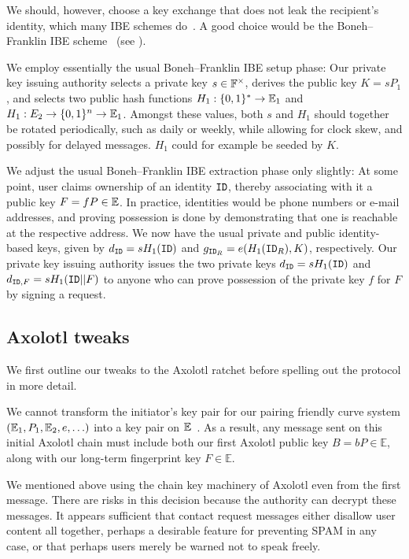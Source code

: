 \documentclass[twoside,letterpaper]{sig-alternate}
\begin{document}
We should, however, choose a key exchange that does not leak the recipient's
identity, which many IBE schemes do~\cite{AnonIBE}.
A good choice would be the Boneh–Franklin IBE scheme~\cite{BF-IBE}
(see \cite[??]{BoyenMIBS}).

We employ essentially the usual Boneh–Franklin IBE setup phase:
Our private key issuing authority
 selects a private key $s \in \mathbb{F}^\times$,
 derives the public key $K = s P_1$, and
 selects two public hash functions
  $H_1 : \{0,1\}^* \to \mathbb{E}_1$ and $H_1 : E_2 \to \{0,1\}^n \to \mathbb{E}_1$.
Amongst these values, both $s$ and $H_1$ should together be rotated
 periodically, such as daily or weekly,
while allowing for clock skew, and possibly for delayed messages.
$H_1$ could for example be seeded by $K$.

We adjust the usual Boneh–Franklin IBE extraction phase only slightly:
At some point, user claims ownership of an identity $\mathtt{ID}$, thereby
 associating with it a public key $F = f P \in \mathbb{E}$.
In practice, identities would be phone numbers or e-mail addresses,
and proving possession is done by demonstrating that
one is reachable at the respective address.
We now have the usual private and public identity-based keys, given by
 $d_{\mathtt{ID}} = s H_1(\mathtt{ID})$ and $g_{\mathtt{ID}_R} = e(H_1(\mathtt{ID}_R),K)$, respectively.
Our private key issuing authority issues the two private keys
 $d_{\mathtt{ID}} = s H_1(\mathtt{ID})$ and $d_{\mathtt{ID},F} = s H_1(\mathtt{ID} || F)$
to anyone who can prove possession of the private key $f$ for $F$
 by signing a request. 

\subsection{Axolotl tweaks} %

We first outline our tweaks to the Axolotl ratchet before
 spelling out the protocol in more detail.

We cannot transform the initiator's key pair for
 our pairing friendly curve system $(\mathbb{E}_1,P_1,\mathbb{E}_2,e,\ldots)$
into a key pair on $\mathbb{E}$~\cite{??no_homomorphism??}.
As a result, any message sent on this initial Axolotl chain must include
both our first Axolotl public key $B = b P \in \mathbb{E}$,
 along with our long-term fingerprint key $F \in \mathbb{E}$.

We mentioned above using the chain key machinery of Axolotl even from
the first message.  There are risks in this decision because the
authority can decrypt these messages.  It appears sufficient that
contact request messages either disallow user content all together,
perhaps a desirable feature for preventing SPAM in any case, or that
perhaps users merely be warned not to speak freely.
\end{document}
